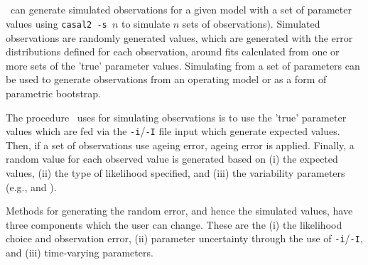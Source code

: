 \subsection{}\label{sec:Simulate}

\CNAME\ can generate simulated observations for a given model with a set of parameter values using \texttt{casal2 -s $n$} to simulate $n$ sets of observations). Simulated observations are randomly generated values, which are generated with the error distributions defined for each observation, around fits calculated from one or more sets of the 'true' parameter values. Simulating from a set of parameters can be used to generate observations from an operating model or as a form of parametric bootstrap. 



The procedure \CNAME\ uses for simulating observations is to use the 'true' parameter values which are fed via the \texttt{-i}/\texttt{-I} file input which generate expected values. Then, if a set of observations use ageing error, ageing error is applied. Finally, a random value for each observed value is generated based on (i) the expected values, (ii) the type of likelihood specified, and (iii) the variability parameters (e.g.,  and ).

Methods for generating the random error, and hence the simulated values, have three components which the user can change. These are the (i) the likelihood choice and observation error, (ii) parameter uncertainty through the use of \texttt{-i}/\texttt{-I}, and (iii) time-varying parameters. 

